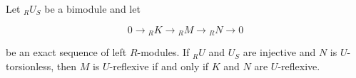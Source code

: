 Let ${}_R U_S$ be a bimodule and let

$$0 \to {}_R K \to {}_R M \to {}_R N \to 0$$

be an exact sequence of left $R$-modules. If ${}_R U$ and $U_S$ are injective and $N$ is $U$-torsionless, then $M$ is $U$-reflexive if and only if $K$ and $N$ are $U$-reflexive.

